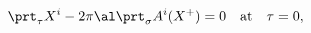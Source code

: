 \begin{equation}
\prt_\tau X^i-2\pi \al \prt_\sigma A^i(X^+)=0
\quad \mbox{at}\quad \tau=0,
\label{null Neumann}
\end{equation}

